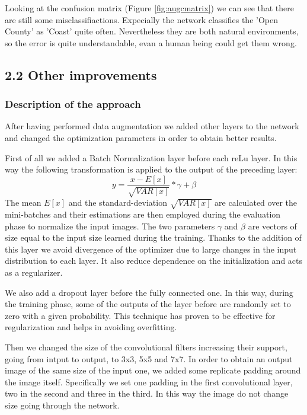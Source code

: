 \documentclass[12pt, a4paper]{report}
\begin{document}
Looking at the confusion matrix (Figure \ref{fig:augcmatrix}) we can see that there are still some misclassifiactions. Expecially the network classifies the 'Open County' as 'Coast' quite often. Nevertheless they are both natural environments, so the error is quite understandable, evan a human being could get them wrong.

\subsection*{2.2 Other improvements}

\subsubsection*{Description of the approach}

After having performed data augmentation we added other layers to the network and changed the optimization parameters in order to obtain better results.

First of all we added a Batch Normalization layer before each reLu layer. In this way the following transformation is applied to the output of the preceding layer:
$$ y = \frac{x - E[x]}{\sqrt{VAR[x]}} * \gamma + \beta$$
The mean $E[x]$ and the standard-deviation $\sqrt{VAR[x]}$ are calculated over the mini-batches and their estimations are then employed during the evaluation phase to normalize the input images. The two parameters $\gamma$ and $\beta$ are vectors of size equal to the input size learned during the training. Thanks to the addition of this layer we avoid divergence of the optimizer due to large changes in the input distribution to each layer. It also reduce dependence on the initialization and acts as a regularizer.

We also add a dropout layer before the fully connected one. In this way, during the training phase, some of the outputs of the layer before are randomly set to zero with a given probability. This technique has proven to be effective for regularization and helps in avoiding overfitting.

Then we changed the size of the convolutional filters increasing their support, going from intput to output, to 3x3, 5x5 and 7x7. In order to obtain an output image of the same size of the input one, we added some replicate padding around the image itself. Specifically we set one padding in the first convolutional layer, two in the second and three in the third. In this way the image do not change size going through the network.
\end{document}
